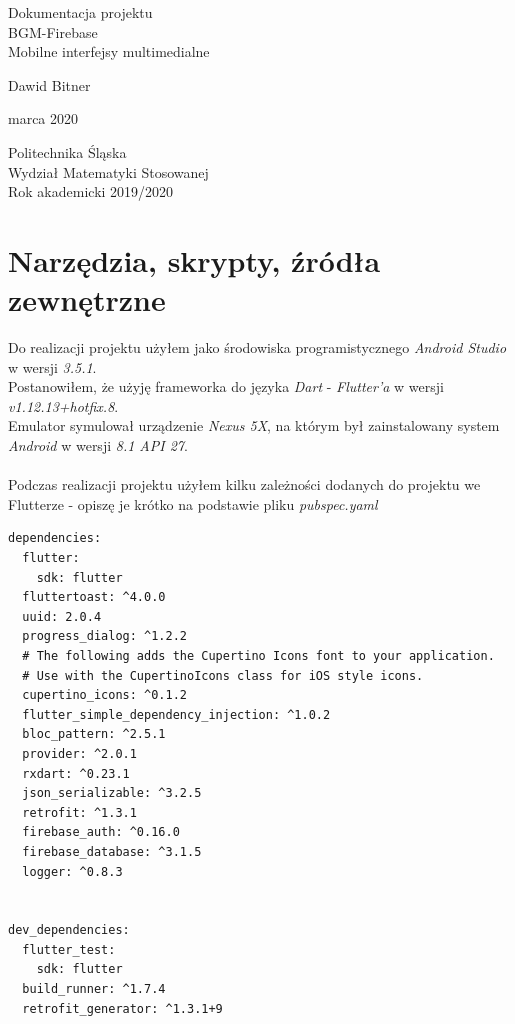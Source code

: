 \documentclass[12pt,a4paper]{article}
\begin{document}
    \begin{titlepage}
       \begin{center}
           \vspace*{1cm}
           
           {\fontsize{23}{25}\selectfont Dokumentacja projektu\\BGM-Firebase\\Mobilne interfejsy multimedialne}
            \vspace{0.4cm}
            
            {\fontsize{17}{18}\selectfont Dawid Bitner}
           
            {\fontsize{12}{13} marca 2020}
           
            \vfill
            \vspace{0.8cm}
     
            {\fontsize{13}{14}\selectfont Politechnika Śląska\\Wydział Matematyki Stosowanej\\Rok akademicki 2019/2020}
     
       \end{center}
    \end{titlepage}
	\newpage
	\tableofcontents
	\newpage
	\section{Narzędzia, skrypty, źródła zewnętrzne}
	Do realizacji projektu użyłem jako środowiska programistycznego\textit{ Android Studio} w wersji \textit{3.5.1}. \\
    Postanowiłem, że użyję frameworka do języka \textit{Dart} - \textit{Flutter'a} w wersji \textit{v1.12.13+hotfix.8}. \\
	Emulator symulował urządzenie \textit{Nexus 5X}, na którym był zainstalowany system\textit{ Android} w wersji \textit{8.1 API 27}. \\
    \\
    Podczas realizacji projektu użyłem kilku zależności dodanych do projektu we Flutterze - opiszę je krótko na podstawie pliku \textit{pubspec.yaml} \\
    \begin{itemize}
    \begin{verbatim}
dependencies:
  flutter:
    sdk: flutter
  fluttertoast: ^4.0.0
  uuid: 2.0.4
  progress_dialog: ^1.2.2
  # The following adds the Cupertino Icons font to your application.
  # Use with the CupertinoIcons class for iOS style icons.
  cupertino_icons: ^0.1.2
  flutter_simple_dependency_injection: ^1.0.2
  bloc_pattern: ^2.5.1
  provider: ^2.0.1
  rxdart: ^0.23.1
  json_serializable: ^3.2.5
  retrofit: ^1.3.1
  firebase_auth: ^0.16.0
  firebase_database: ^3.1.5
  logger: ^0.8.3


dev_dependencies:
  flutter_test:
    sdk: flutter
  build_runner: ^1.7.4
  retrofit_generator: ^1.3.1+9
    \end{verbatim}
    \end{itemize}
    
\end{document}
